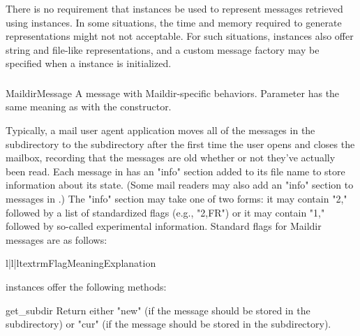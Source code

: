 There is no requirement that  instances be used to represent
messages retrieved using  instances. In some situations, the
time and memory required to generate  representations might not
not acceptable. For such situations,  instances also offer
string and file-like representations, and a custom message factory may be
specified when a  instance is initialized. 

\subsubsection{}
\label{mailbox-maildirmessage}

\begin{classdesc}{MaildirMessage}{}
A message with Maildir-specific behaviors. Parameter 
has the same meaning as with the  constructor.
\end{classdesc}

Typically, a mail user agent application moves all of the messages in the
 subdirectory to the  subdirectory after the first time the
user opens and closes the mailbox, recording that the messages are old whether
or not they've actually been read. Each message in  has an "info"
section added to its file name to store information about its state. (Some mail
readers may also add an "info" section to messages in .) The "info"
section may take one of two forms: it may contain "2," followed by a list of
standardized flags (e.g., "2,FR") or it may contain "1," followed by so-called
experimental information. Standard flags for Maildir messages are as follows:

\begin{tableiii}{l|l|l}{textrm}{Flag}{Meaning}{Explanation}
\end{tableiii}

 instances offer the following methods:

\begin{methoddesc}{get_subdir}{}
Return either "new" (if the message should be stored in the 
subdirectory) or "cur" (if the message should be stored in the 
subdirectory). 
\end{methoddesc}

